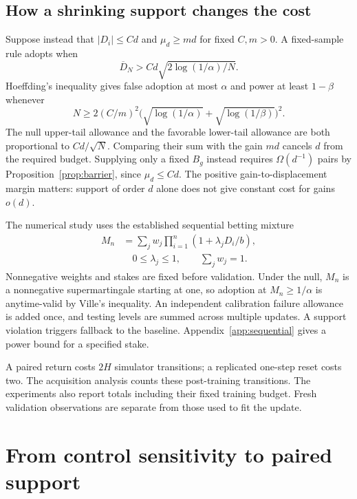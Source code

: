 \documentclass[twocolumn,nameyear]{autart}
\begin{document}
\subsection{How a shrinking support changes the cost}
Suppose instead that $|D_i|\le Cd$ and $\mu_d\ge md$ for fixed
$C,m>0$. A fixed-sample rule adopts when
\begin{equation}\label{eq:hoeffding-rule}
 \overline D_N>Cd\sqrt{2\log(1/\alpha)/N}.
\end{equation}
Hoeffding's inequality \citep{hoeffding1963probability} gives false
adoption at most $\alpha$ and power at least $1-\beta$ whenever
\begin{equation}\label{eq:validation-size}
 N\ge2(C/m)^2\bigl(\sqrt{\log(1/\alpha)}
                      +\sqrt{\log(1/\beta)}\bigr)^2.
\end{equation}
The null upper-tail allowance and the favorable lower-tail allowance
are both proportional to $Cd/\sqrt N$. Comparing their sum with the
gain $md$ cancels $d$ from the required budget. Supplying only a fixed
$B_g$ instead requires $\Omega(d^{-1})$ pairs by
Proposition~\ref{prop:barrier}, since $\mu_d\le Cd$.
The positive gain-to-displacement margin matters: support of order $d$
alone does not give constant cost for gains $o(d)$.

The numerical study uses the established sequential betting mixture
\citep{waudbysmith2024betting}
\begin{align}\label{eq:betting}
 M_n&=\sum_jw_j\prod_{i=1}^n(1+\lambda_jD_i/b),\nonumber\\
 &\hspace{1em}0\le\lambda_j\le1,\qquad\sum_jw_j=1.
\end{align}
Nonnegative weights and stakes are fixed before validation. Under the
null, $M_n$ is a nonnegative supermartingale starting at one, so adoption
at $M_n\ge1/\alpha$ is anytime-valid by Ville's inequality. An
independent calibration failure allowance is added once, and testing
levels are summed across multiple updates. A support violation triggers
fallback to the baseline. Appendix~\ref{app:sequential} gives a power
bound for a specified stake.

A paired return costs $2H$ simulator transitions; a replicated one-step
reset costs two. The acquisition analysis counts these post-training
transitions. The experiments also report totals including their fixed
training budget. Fresh validation observations are separate from those
used to fit the update.

\section{From control sensitivity to paired support}\label{sec:sensitivity}
\end{document}
